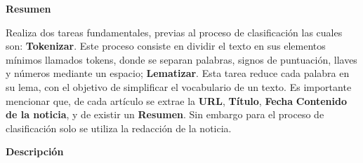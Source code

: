 
\begin{large}
	\textbf{Resumen}\\
\end{large}

Realiza dos tareas fundamentales, previas al proceso de clasificación las cuales son: \textbf{Tokenizar}. Este proceso consiste en dividir el texto en sus elementos mínimos llamados tokens, donde se separan palabras, signos de puntuación, llaves y números mediante un espacio; \textbf{Lematizar}. Esta tarea reduce cada palabra en su lema, con el objetivo de simplificar el vocabulario de un texto. Es importante mencionar que, de cada artículo se extrae la \textbf{URL}, \textbf{Título}, \textbf{Fecha} \textbf{Contenido de la noticia}, y de existir un \textbf{Resumen}. Sin embargo para el proceso de clasificación solo se utiliza la redacción de la noticia.\\ 


\begin{large}
	\textbf{Descripción}\\
\end{large} 


